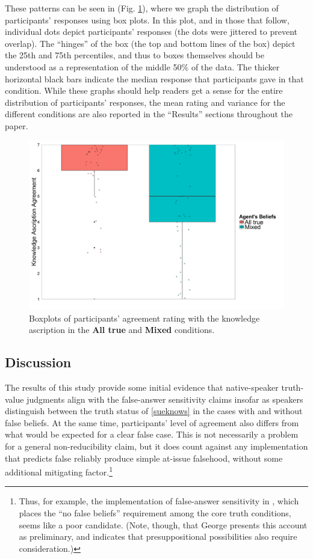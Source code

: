 \documentclass[a4paper]{article}
\begin{document}
These patterns can be seen in (Fig. \ref{fig:Fig1}), where we graph the distribution of participants' responses using box plots. In this plot, and in those that follow, individual dots depict participants' responses (the dots were jittered to prevent overlap). The ``hinges'' of the box (the top and bottom lines of the box) depict the 25th and 75th percentiles, and thus to boxes themselves should be understood as a representation of the middle 50\% of the data. The thicker horizontal black bars indicate the median response that participants gave in that condition. While these graphs should help readers get a sense for the entire distribution of participants' responses, the mean rating and variance for the different conditions are also reported in the ``Results'' sections throughout the paper.

\begin{figure}[h!]
\centering
\includegraphics[width=14cm] {Fig1}
\captionsetup{width=0.9\textwidth}
\caption{Boxplots of participants' agreement rating with the knowledge ascription in the \textbf{All true} and \textbf{Mixed} conditions.}
\label{fig:Fig1}
\end{figure}

\subsection{Discussion}
The results of this study provide some initial evidence that native-speaker truth-value judgments align with the false-answer sensitivity claims insofar as speakers distinguish between the truth status of \ref{sueknows} in the cases with and without false beliefs. At the same time, participants' level of agreement also differs from what would be expected for a clear false case. This is not necessarily a problem for a general non-reducibility claim, but it does count against any implementation that predicts false  reliably produce simple at-issue falsehood, without some additional mitigating factor.\footnote{Thus, for example, the implementation of false-answer sensitivity in \cite{george:dis}, which places the ``no false beliefs'' requirement among the core truth conditions, seems like a poor candidate. (Note, though, that George presents this account as preliminary, and indicates that presuppositional possibilities also require consideration.)}
\end{document}
